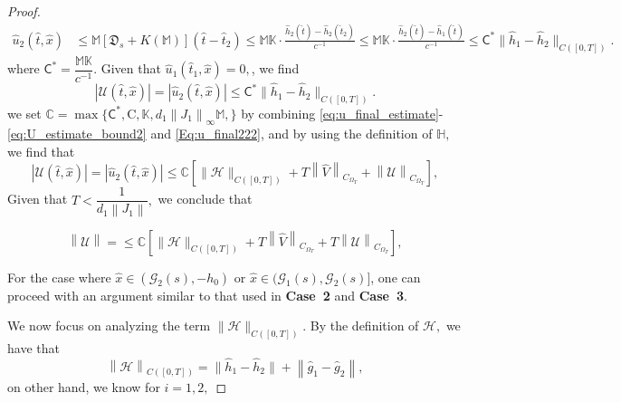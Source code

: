 \documentclass[a4paper,11pt]{amsart}
\theoremstyle{definition}
\numberwithin{equation}{section}
\theoremstyle{definition}
\begin{document}
\begin{proof}
\begin{align*}
\hat{u}_2\left(\hat{t}, \hat{x}\right)
&\leq \mathbb{M} [\mathfrak{D}_s + K(\mathbb{M} )] \left(\hat{t} - \hat{t}_2\right)\leq \mathbb{M} \mathbb{K} \cdot \frac{ \hat{h}_2(\hat{t}) - \hat{h}_2(\hat{t}_2) }{  c^{-1} }\leq \mathbb{M} \mathbb{K} \cdot \frac{ \hat{h}_2(\hat{t}) - \hat{h}_1(\hat{t}) }{  c^{-1} }\leq \mathsf{C}^\ast \| \hat{h}_1 - \hat{h}_2 \|_{C([0,T])}.
\end{align*}
where $\mathsf{C}^\ast = \dfrac{\mathbb{M} \mathbb{K}}{ c^{-1}} .$ Given that $\hat{u}_1(\hat{t}_1, \hat{x})=0,$, we find
\begin{equation}\label{Eq:u_final222}
|\mathcal{U}(\hat{t}, \hat{x})|= |\hat{u}_2\left(\hat{t}, \hat{x}\right)| \leq \mathsf{C}^\ast \| \hat{h}_1 - \hat{h}_2 \|_{C([0,T])}.
\end{equation}
we set $ \mathbb{C}=\max\{\mathsf{C}^\ast, \mathrm{C}, \mathbb{K}, d_1 \left\|J_1 \right\|_\infty \mathbb{M}, \}$
by combining \eqref{eq:u_final_estimate}-\eqref{eq:U_estimate_bound2} and \eqref{Eq:u_final222}, and by using the definition of $\mathbb{H},$ we find that
\begin{equation}\label{Eq:u_final1}
|\mathcal{U}(\hat{t}, \hat{x})|= |\hat{u}_2\left(\hat{t}, \hat{x}\right)| \leq \mathbb{C} \left[ \| \mathcal{H} \|_{C([0,T])}+ T\left\| \hat{V} \right\|_{ C_{\Omega_T}}  + \left\| \mathcal{U} \right\|_{ C_{\Omega_T}}    \right],
\end{equation}
Given that $T < \dfrac{1}{d_1 \left\| J_1\right\|},$ we conclude that

\begin{equation}\label{Eq:u_final11}
\left\|\mathcal{U}\right\|= \leq \mathbb{C} \left[ \| \mathcal{H} \|_{C([0,T])}+ T\left\| \hat{V} \right\|_{ C_{\Omega_T}}  + T\left\| \mathcal{U} \right\|_{ C_{\Omega_T}}    \right],
\end{equation}


For the case where $\hat{x} \in (\mathcal{G}_2(s), -h_0)$ or
$\hat{x} \in (\mathcal{G}_1(s), \mathcal{G}_2(s)]$, one can proceed with an argument similar to that used in \textbf{Case~2} and \textbf{Case~3}.





We now focus on analyzing the term $ \| \mathcal{H} \| _{C ([0,T])}. $   By the definition of $\mathcal{H}, $ we have  that  $$\left\| \mathcal{H} \right\|_{C([0,T])} = \|\hat{h}_1- \hat{h}_2 \| + \left\|\hat{g}_1- \hat{g}_2 \right\|,$$ on other hand, we know  for $i=1,2 ,$


\end{proof}
\end{document}
